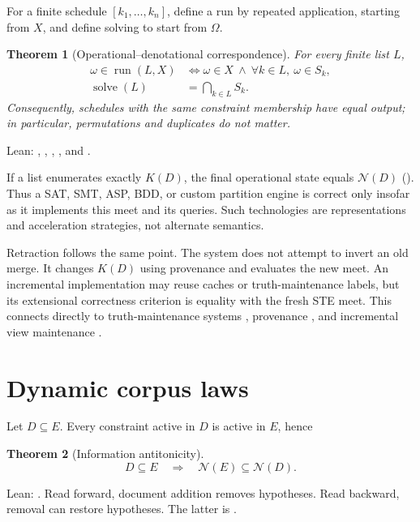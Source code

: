 \documentclass[11pt]{article}
\newtheorem{theorem}{Theorem}[section]
\theoremstyle{definition}
\theoremstyle{remark}
\newcommand{\Hyp}{\Omega}
\newcommand{\Feas}{\mathcal N}
\begin{document}
For a finite schedule $[k_1,\ldots,k_n]$, define a run by repeated
application, starting from $X$, and define solving to start from $\Hyp$.

\begin{theorem}[Operational--denotational correspondence]
For every finite list $L$,
\begin{align}
  \omega\in\operatorname{run}(L,X)
    &\Longleftrightarrow
      \omega\in X\ \land\ \forall k\in L,\ \omega\in S_k,\\
  \operatorname{solve}(L)
    &=\bigcap_{k\in L}S_k.
\end{align}
Consequently, schedules with the same constraint membership have equal output;
in particular, permutations and duplicates do not matter.
\end{theorem}
\noindent Lean: ,
,
,
, and .

If a list enumerates exactly $K(D)$, the final operational state equals
$\Feas(D)$ ().  Thus a SAT, SMT, ASP, BDD, or
custom partition engine is correct only insofar as it implements this meet and
its queries.  Such technologies are representations and acceleration
strategies, not alternate semantics.

Retraction follows the same point.  The system does not attempt to invert an
old merge.  It changes $K(D)$ using provenance and evaluates the new meet.  An
incremental implementation may reuse caches or truth-maintenance labels, but
its extensional correctness criterion is equality with the fresh STE meet.
This connects directly to truth-maintenance systems
\citep{doyle1979tms,dekleer1986atms}, provenance
\citep{green2007provenance}, and incremental view maintenance
\citep{budiu2023dbsp}.

\section{Dynamic corpus laws}\label{sec:dynamic}

Let $D\subseteq E$.  Every constraint active in $D$ is active in $E$, hence
\begin{theorem}[Information antitonicity]
\[
  D\subseteq E\quad\Longrightarrow\quad \Feas(E)\subseteq\Feas(D).
\]
\end{theorem}
\noindent Lean: .  Read forward, document
addition removes hypotheses.  Read backward, removal can restore hypotheses.
The latter is .
\end{document}
